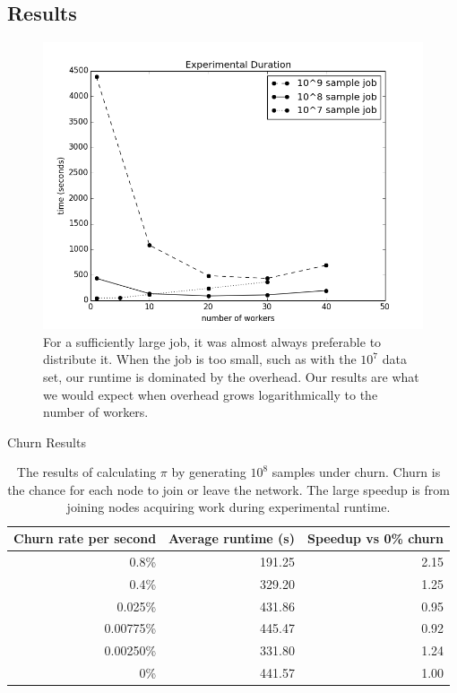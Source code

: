 \documentclass[11pt]{beamer}
\begin{document}
\subsection{Results}


\begin{frame}
\begin{figure}
    \includegraphics[width=0.65\linewidth]{expTime}
    \caption{For a sufficiently large job, it was almost always preferable to distribute it.  When the job is too small, such as with the $10^{7}$ data set, our runtime is dominated by the overhead.  Our results are what we would expect when overhead grows logarithmically to the number of workers.}
    \label{expTime}
\end{figure}

\end{frame}

\begin{frame}{Churn Results}
\begin{table}
    \centering
    \begin{tabular}{|r|r|r|} 
        \hline 
        Churn rate per second & Average runtime (s) & Speedup vs 0\% churn\\ \hline{}
        0.8\% & 191.25 & 2.15 \\ \hline
        0.4\% & 329.20 & 1.25 \\ \hline
        0.025\% & 431.86 & 0.95 \\ \hline 
        0.00775\%  & 445.47 & 0.92 \\ \hline 
        0.00250\% & 331.80  &  1.24 \\ \hline 
        0\% & 441.57 & 1.00 \\ \hline
    \end{tabular}
    \caption{The results of calculating $\pi$ by generating $10^8$ samples under churn. Churn is the chance for each node to join or leave the network. The large speedup is from joining nodes acquiring work during experimental runtime.} 
    \label{churnSpeed}
\end{table}

\end{frame}
\end{document}

